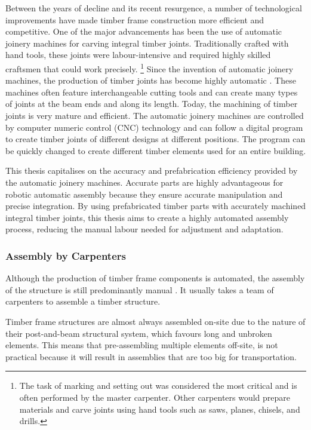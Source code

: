 Between the years of decline and its recent resurgence, a number of technological improvements have made timber frame construction more efficient and competitive. One of the major advancements has been the use of automatic joinery machines for carving integral timber joints. Traditionally crafted with hand tools, these joints were labour-intensive and required highly skilled craftsmen that could work precisely.
\footnote{The task of marking and setting out was considered the most critical and is often performed by the master carpenter. Other carpenters would prepare materials and carve joints using hand tools such as saws, planes, chisels, and drills.}
Since the invention of automatic joinery machines, the production of timber joints has become highly automatic \parencite{hanshundeggeragCorporateDevelopment2023}. These machines often feature interchangeable cutting tools and can create many types of joints at the beam ends and along its length. Today, the machining of timber joints is very mature and efficient. The automatic joinery machines are controlled by computer numeric control (CNC) technology and can follow a digital program to create timber joints of different designs at different positions. The program can be quickly changed to create different timber elements used for an entire building. 

This thesis capitalises on the accuracy and prefabrication efficiency provided by the automatic joinery machines. Accurate parts are highly advantageous for robotic automatic assembly because they ensure accurate manipulation and precise integration. By using prefabricated timber parts with accurately machined integral timber joints, this thesis aims to create a highly automated assembly process, reducing the manual labour needed for adjustment and adaptation. 

\subsubsection{Assembly by Carpenters}
\label{subsubsection:introduction-assembly-by-carpenters}

Although the production of timber frame components is automated, the assembly of the structure is still predominantly manual \parencite{willmannNewParadigmsAutomatic2016}. It usually takes a team of carpenters to assemble a timber structure.

Timber frame structures are almost always assembled on-site due to the nature of their post-and-beam structural system, which favours long and unbroken elements. This means that pre-assembling multiple elements off-site, is not practical because it will result in assemblies that are too big for transportation. 

